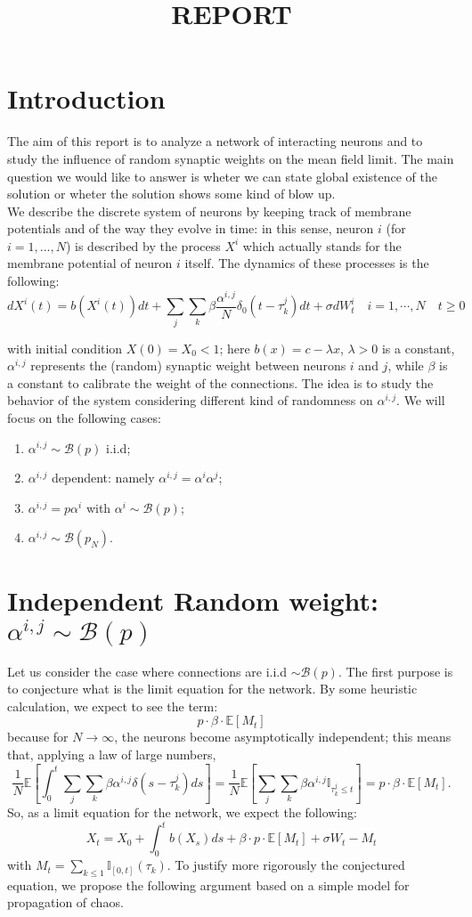 \documentclass[11pt, a4paper]{article}
\begin{document}
\title{REPORT}
\date{}
\maketitle
\section*{Introduction}
The aim of this report is to analyze a network of interacting neurons and to study the influence of random synaptic weights on the mean field limit. The main question we would like to answer is wheter we can state global existence of the solution or wheter the solution shows some kind of blow up.\\
We describe the discrete system of neurons by keeping track of membrane potentials and of the way they evolve in time: in this sense, neuron $i$ (for $i = 1, ..., N$) is described by the process $X^i$ which actually stands for the membrane potential of neuron $i$ itself. The dynamics of these processes is the following:
\[dX^{i}(t)=b(X^i(t))dt+\sum_j\sum_k \beta\frac{\alpha^{i,j}}{N}\delta_0(t-\tau^j_k)dt+\sigma dW^i_t\quad i=1,\cdots,N\quad t\geq 0 \]

with initial condition $X(0)=X_0<1$; here $b(x)=c-\lambda x$, $\lambda>0$ is a constant, $\alpha^{i,j}$ represents the (random) synaptic weight between neurons $i$ and $j$, while $\beta$ is a constant to calibrate the weight of the connections. The idea is to study the behavior of the system considering different kind of randomness on $\alpha^{i,j}$. We will focus on the following cases:
\begin{enumerate}
\item $\alpha^{i,j}\sim \mathcal{B}(p)$ i.i.d;
\item $\alpha^{i,j}$ dependent: namely $\alpha^{i,j}=\alpha^i\alpha^j$;
\item $\alpha^{i,j}=p\alpha^i$ with $\alpha^i\sim\mathcal{B}(p)$;
\item $\alpha^{i,j}\sim \mathcal{B}(p_N)$.
\end{enumerate}
\section{Independent Random weight: $\alpha^{i,j}\sim \mathcal{B}(p)$}
Let us consider the case where connections are i.i.d $\sim \mathcal{B}(p)$. The first purpose is to conjecture what is the limit equation for the network. By some heuristic calculation, we expect to see the term:
\[p\cdot \beta\cdot \mathbb{E}[{M_t}]\]
because for $N\rightarrow \infty$, the neurons become asymptotically independent; this means that, applying a law of large numbers,
\[\frac{1}{N}\mathbb{E}\left[\int_0^t\sum_j\sum_k\beta\alpha^{i,j}\delta(s-\tau^j_k)ds\right]=\frac{1}{N} \mathbb{E}\left[\sum_j\sum_k\beta\alpha^{i,j}\mathbb{I}_{\tau^j_k\leq t}\right]=p\cdot \beta\cdot \mathbb{E}[{M_t}]. \] 
So, as a limit equation for the network, we expect the following:
\[X_t=X_0+\int_0^t b(X_s)ds+\beta\cdot p\cdot\mathbb{E}[M_t]+\sigma W_t-M_t\]
with $M_t=\sum_{k\leq 1}\mathbb{I}_{[0,t]}(\tau_k)$.
To justify more rigorously the conjectured equation, we propose the following argument based on a simple model for propagation of chaos. 
\end{document}
